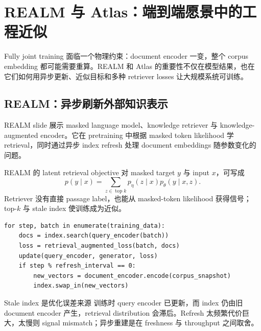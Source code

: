 \section{REALM 与 Atlas：端到端愿景中的工程近似}

Fully joint training 面临一个物理约束：document encoder 一变，整个 corpus embedding 都可能需要重算。REALM 和 Atlas 的重要性不仅在模型结果，也在它们如何用异步更新、近似目标和多种 retriever losses 让大规模系统可训练。

\subsection{REALM：异步刷新外部知识表示}

REALM slide 展示 masked language model、knowledge retriever 与 knowledge-augmented encoder。它在 pretraining 中根据 masked token likelihood 学 retrieval，同时通过异步 index refresh 处理 document embeddings 随参数变化的问题。


\begin{importantbox}{REALM 的 latent retrieval objective}
对 masked target $y$ 与 input $x$，可写成
\[
p(y\mid x)=\sum_{z\in\operatorname{top}k}p_\eta(z\mid x)
p_\theta(y\mid x,z).
\]
Retriever 没有直接 passage label，也能从 masked-token likelihood 获得信号；top-$k$ 与 stale index 使训练成为近似。
\end{importantbox}

\begin{lstlisting}[caption={异步 document-index refresh 的训练骨架}]
for step, batch in enumerate(training_data):
    docs = index.search(query_encoder(batch))
    loss = retrieval_augmented_loss(batch, docs)
    update(query_encoder, generator, loss)
    if step % refresh_interval == 0:
        new_vectors = document_encoder.encode(corpus_snapshot)
        index.swap_in(new_vectors)
\end{lstlisting}

\begin{warningbox}{Stale index 是优化误差来源}
训练时 query encoder 已更新，而 index 仍由旧 document encoder 产生，retrieval distribution 会滞后。Refresh 太频繁代价巨大，太慢则 signal mismatch；异步重建是在 freshness 与 throughput 之间取舍。
\end{warningbox}


